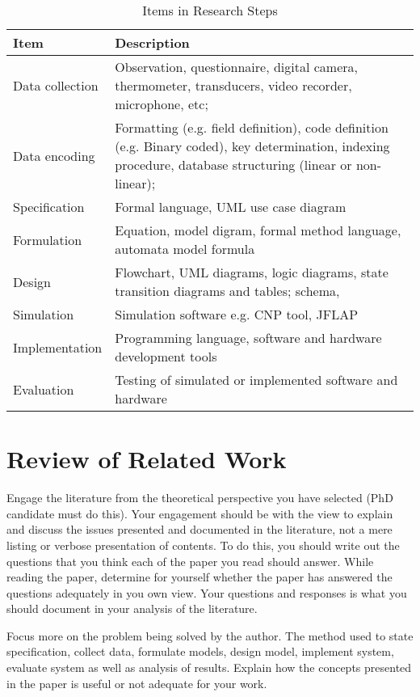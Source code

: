 \begin{table}[h!]
\caption{Items in Research Steps}
\begin{tabular}{p{3.0cm} p{10.0cm}} \hline \hline
Item  & Description \\ \hline \hline	
Data collection & Observation, questionnaire, digital camera, thermometer, transducers, video recorder, microphone, etc;  \\ \hline
Data encoding & Formatting (e.g. field definition), code definition (e.g. Binary coded), key determination, indexing procedure, database structuring (linear or non-linear);  \\ \hline
Specification & Formal language, UML use case diagram \\\hline
Formulation & Equation, model digram, formal method language, automata model formula \\\hline
Design & Flowchart, UML diagrams, logic diagrams, state transition diagrams and tables; schema, \\\hline
Simulation  & Simulation software e.g. CNP tool, JFLAP \\\hline
Implementation & Programming language, software and hardware development tools\\ \hline
Evaluation & Testing of simulated or implemented software and hardware\\ \hline \hline
\end{tabular}
\label{Table1}
\end{table}

 
\section{Review of Related Work}
Engage the literature from the theoretical perspective you have selected (PhD candidate must do this). Your engagement should be with the view to explain and discuss the issues presented and documented in the literature, not a mere listing or verbose presentation of contents. To do this, you should write out the questions that you think each of the paper you read should answer. While reading the paper, determine for yourself whether the paper has answered the questions adequately in you own view. Your questions and responses is what you should document in your analysis of the literature.

Focus more on the problem being solved by the author. The method used to state specification, collect data, formulate models, design model, implement system, evaluate system as well as analysis of results. Explain how the concepts presented in the paper is useful or not adequate for your work.

